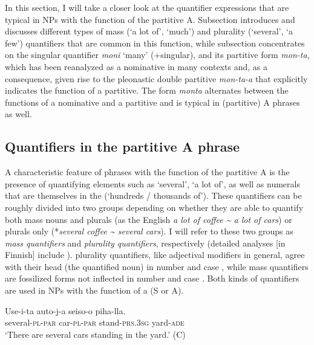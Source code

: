 \documentclass[output=paper]{LSP/langsci}
\begin{document}
In this section, I will take a closer look at the quantifier expressions that are typical in NPs with the function of the partitive A. Subsection  introduces and discusses different types of mass (‘a lot of’, ‘much’) and plurality (‘several’, ‘a few’) quantifiers that are common in this function, while subsection  concentrates on the singular quantifier \textit{moni} ‘many’ (+singular), and its partitive form \textit{mon-ta}, which has been reanalyzed as a nominative in many contexts and, as a consequence, given rise to the pleonastic double partitive \textit{mon-ta-a} that explicitly indicates the function of a partitive. The form \textit{monta} alternates between the functions of a nominative and a partitive and is typical in (partitive) A phrases as well. 

\subsection{Quantifiers in the partitive A phrase}\label{15-hu-sec:6-1}

A characteristic feature of phrases with the function of the partitive A is the presence of quantifying elements such as ‘several’, ‘a lot of’, as well as  numerals that are themselves in the  (‘hundreds / thousands of’). These quantifiers can be roughly divided into two groups depending on whether they are able to quantify both mass nouns and plurals (as the English \textit{a lot of coffee {\textasciitilde} a lot of cars}) or plurals only (*\textit{several coffee {\textasciitilde} several cars}). I will refer to these two groups as \textit{mass quantifiers} and \textit{plurality quantifiers}, respectively (detailed analyses [in Finnish] include \citealt{Hakulinenetal1979Nykysuomen,Huumo2017Objektia,Huumo2017S}).  plurality quantifiers, like adjectival modifiers in general, agree with their head (the quantified noun) in number and case , while mass quantifiers are fossilized forms not inflected in number and case . Both kinds of quantifiers are used in NPs with the function of a  (S or A).

\ea%
\label{15-hu-ex:32}

\gll Use-i-ta auto-j-a seiso-o piha-lla.\\
several-\textsc{pl}-\textsc{par} car-\textsc{pl}-\textsc{par} stand-\textsc{prs}.\textsc{3sg} yard-\textsc{ade}\\
\glt ‘There are several cars standing in the yard.’  (C)
\z
\end{document}
